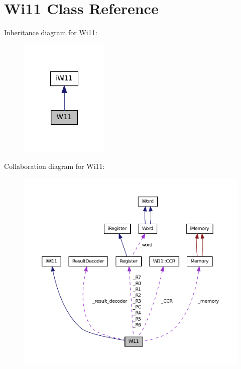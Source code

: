 \hypertarget{classWi11}{
\section{Wi11 Class Reference}
\label{classWi11}
}


Inheritance diagram for Wi11:\nopagebreak
\begin{figure}[H]
\begin{center}
\leavevmode
\includegraphics[width=120pt]{classWi11__inherit__graph}
\end{center}
\end{figure}


Collaboration diagram for Wi11:\nopagebreak
\begin{figure}[H]
\begin{center}
\leavevmode
\includegraphics[width=400pt]{classWi11__coll__graph}
\end{center}
\end{figure}
